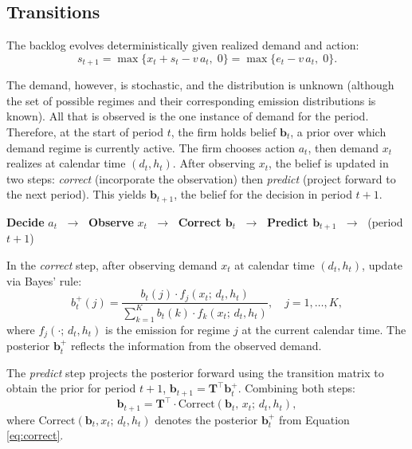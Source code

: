\documentclass[preprint,11pt,authoryear]{elsarticle}
\newcommand{\bvec}[1]{\mathbf{#1}}
\theoremstyle{remark}
\begin{document}
\subsection{Transitions}

The backlog evolves deterministically given realized demand and action:
\begin{equation}
    s_{t+1} = \max\{x_t + s_t - v \, a_t, \; 0\} = \max\{e_t - v \, a_t, \; 0\}.
    \label{eq:backlog_transition}
\end{equation}

The demand, however, is stochastic, and the distribution is unknown (although the set of possible regimes and their corresponding emission distributions is known). All that is observed is the one instance of demand for the period. Therefore, at the start of period $t$, the firm holds belief $\bvec{b}_t$, a prior over which demand regime is currently active. The firm chooses action $a_t$, then demand $x_t$ realizes at calendar time $(d_t, h_t)$. After observing $x_t$, the belief is updated in two steps: \emph{correct} (incorporate the observation) then \emph{predict} (project forward to the next period). This yields $\bvec{b}_{t+1}$, the belief for the decision in period $t+1$.

\begin{center}
\textbf{Decide} $a_t$
      $\;\to\;$ \textbf{Observe} $x_t$
      $\;\to\;$ \textbf{Correct $\bvec{b}_t$}
      $\;\to\;$ \textbf{Predict $\bvec{b}_{t+1}$}
      $\;\to\;$ (period $t+1$)
\end{center}

In the \emph{correct} step, after observing demand $x_t$ at calendar time $(d_t, h_t)$, update via Bayes' rule:
\begin{equation}
    b_t^+(j) = \frac{b_t(j) \cdot f_j(x_t;\, d_t, h_t)}
                    {\displaystyle\sum_{k=1}^{K} b_t(k) \cdot f_k(x_t;\, d_t, h_t)},
    \quad j = 1, \ldots, K,
    \label{eq:correct}
\end{equation}
where $f_j(\cdot;\, d_t, h_t)$ is the emission for regime $j$ at the current calendar time. The posterior $\bvec{b}_t^+$ reflects the information from the observed demand.

The \emph{predict} step projects the posterior forward using the transition matrix to obtain the prior for period $t+1$, $\bvec{b}_{t+1} = \bvec{T}^\top \bvec{b}_t^+$. Combining both steps:
\begin{equation}
    \bvec{b}_{t+1} = \bvec{T}^\top \cdot \mathrm{Correct}(\bvec{b}_t,\, x_t;\, d_t, h_t),
    \label{eq:belief_combined}
\end{equation}
where $\mathrm{Correct}(\bvec{b}_t, x_t;\, d_t, h_t)$ denotes the posterior $\bvec{b}_t^+$ from Equation \eqref{eq:correct}.
\end{document}
